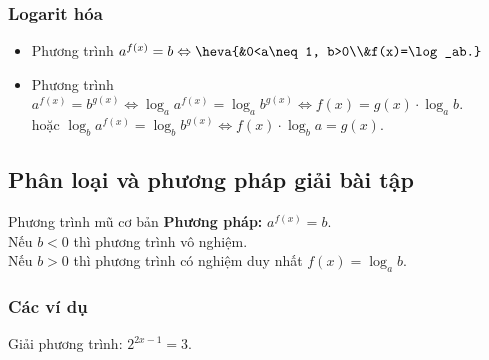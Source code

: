 \subsubsection{Logarit hóa}
\begin{itemize}
	\item Phương trình $a^{f(x)}=b\Leftrightarrow\heva{&0<a\neq 1, b>0\\&f(x)=\log_ab.}$
	\item Phương trình $a^{f(x)}=b^{g(x)}\Leftrightarrow\log_aa^{f(x)}=\log_ab^{g(x)}\Leftrightarrow f(x)=g(x)\cdot\log_ab$.\\
	hoặc $\log_ba^{f(x)}=\log_bb^{g(x)}\Leftrightarrow f(x)\cdot\log_ba=g(x)$.
\end{itemize}
\subsection{Phân loại và phương pháp giải bài tập}
\begin{dang}{Phương trình mũ cơ bản}
	\textbf{Phương pháp:} $a^{f(x)}=b$.\\
	Nếu $b<0$ thì phương trình vô nghiệm.\\
	Nếu $b>0$ thì phương trình có nghiệm duy nhất $f(x)=\log_ab$.
\end{dang}

\subsubsection{Các ví dụ}
\begin{vd}%
	Giải phương trình: $2^{2x-1}=3$.
\end{vd}

